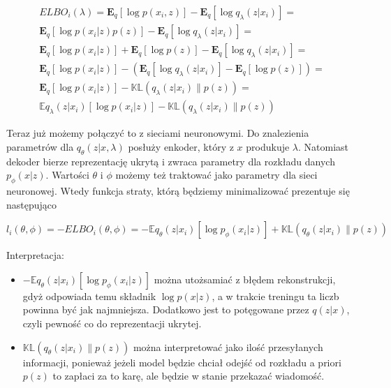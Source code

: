 \begin{equation}
\begin{split}
E L B O _ { i } ( \lambda ) = \mathbf { E } _ { q } [ \log p ( x_i , z ) ] - \mathbf { E } _ { q } \left[ \log q _ { \lambda } ( z | x_i ) \right] = \\
\mathbf { E } _ { q } [ \log p ( x_i | z ) p(z){} ] - \mathbf { E } _ { q } \left[ \log q _ { \lambda } ( z | x_i ) \right] = \\
\mathbf { E } _ { q } [ \log p ( x_i | z ){} ] + \mathbf { E } _ { q } [ \log p(z){} ] - \mathbf { E } _ { q } \left[ \log q _ { \lambda } ( z | x_i ) \right] = \\
\mathbf { E } _ { q } [ \log p ( x_i | z ){} ] - (\mathbf { E } _ { q } \left[ \log q _ { \lambda } ( z | x_i ) \right] - \mathbf { E } _ { q } [ \log p(z){} ])= \\
\mathbf { E } _ { q } [ \log p ( x_i | z ){} ] - \mathbb { K } \mathbb { L } \left( q _ { \lambda } ( z | x _ { i } ) \| p ( z ) \right) = \\
\mathbb { E } q _ { \lambda } ( z | x _ { i } ) \left[ \log p \left( x _ { i } | z \right) \right] - \mathbb { K } \mathbb { L } \left( q _ { \lambda } ( z | x _ { i } ) \| p ( z ) \right)
\end{split}
\end{equation}

Teraz już możemy połączyć to z sieciami neuronowymi. Do znalezienia parametrów dla $q _ { \theta } ( z | x , \lambda )$ posłuży enkoder, który z $x$ produkuje $\lambda$. Natomiast dekoder bierze reprezentację ukrytą i zwraca parametry dla rozkładu danych $p _ { \phi } ( x | z )$. Wartości $\theta$ i $\phi$ możemy też traktować jako parametry dla sieci neuronowej. Wtedy funkcja straty, którą będziemy minimalizować prezentuje się następująco

\begin{equation}
l _ { i } ( \theta , \phi ) = -E L B O _ { i } ( \theta , \phi ) = -\mathbb { E } q _ { \theta } ( z | x _ { i } ) \left[ \log p _ { \phi } \left( x _ { i } | z \right) \right] + \mathbb { K } \mathbb { L } \left( q _ { \theta } ( z | x _ { i } ) \| p ( z ) \right)
\end{equation}

Interpretacja:
\begin{itemize}[]
\item $-\mathbb { E } q _ { \theta } ( z | x _ { i } ) \left[ \log p _ { \phi } \left( x _ { i } | z \right) \right]$ można utożsamiać z błędem rekonstrukcji, gdyż odpowiada temu składnik $\log p(x|z)$, a w trakcie treningu ta liczb powinna być jak najmniejsza. Dodatkowo jest to potęgowane przez $q(z|x)$, czyli pewność co do reprezentacji ukrytej.

\item $\mathbb { K } \mathbb { L } \left( q _ { \theta } ( z | x _ { i } ) \| p ( z ) \right)$ można interpretować jako ilość przesyłanych informacji, ponieważ jeżeli model będzie chciał odejść od rozkładu a priori $p(z)$ to zapłaci za to karę, ale będzie w stanie przekazać wiadomość.
\end{itemize}

